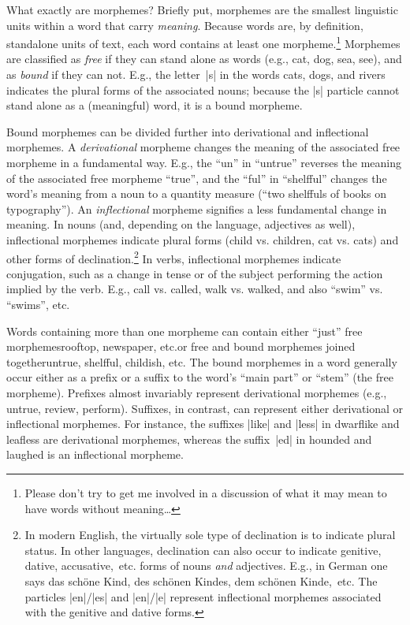 \documentclass[11pt]{article}
\begin{document}
What exactly are morphemes? Briefly put, morphemes are the smallest linguistic units within a word that carry \emph{meaning}. Because words are, by definition, standalone units of text, each word contains at least one morpheme.\footnote{Please don't try to get me involved in a discussion of what it may mean to have words without meaning\dots} Morphemes are classified as \emph{free} if they can stand alone as words (e.g., cat, dog, sea, see), and as \emph{bound} if they can not. E.g., the letter~|s| in the words cats, dogs, and rivers indicates the plural forms of the associated nouns; because the |s| particle cannot stand alone as a (meaningful) word, it is a bound morpheme. 

Bound morphemes can be divided further into derivational and inflectional morphemes. A \emph{derivational} morpheme changes the meaning of the associated free morpheme in a fundamental way. E.g., the \enquote{un} in \enquote{untrue} reverses the meaning of the associated free morpheme \enquote{true}, and the \enquote{ful} in \enquote{shelfful} changes the word's meaning from a noun to a quantity measure (\enquote{two shelffuls of books on typography}). 
An \emph{inflectional} morpheme signifies a less fundamental change in meaning. In nouns (and, depending on the language, adjectives as well), inflectional morphemes indicate plural forms (child vs. children, cat vs. cats) and other forms of declination.\footnote{In modern English, the virtually sole type of declination is to indicate plural status. In other languages, declination can also occur to indicate genitive, dative, accusative,~etc. forms of nouns \emph{and} adjectives. E.g., in German one says das schöne Kind, des schönen Kindes, dem schönen Kinde,~etc. The particles |en|/|es| and |en|/|e| represent inflectional morphemes associated with the genitive and dative forms.} In verbs, inflectional morphemes indicate conjugation, such as a change in tense or of the subject performing the action implied by the verb. E.g., call vs. called, walk vs. walked, and also \enquote{swim} vs. \enquote{swims}, etc. 

Words containing more than one morpheme can contain either \enquote{just} free morphemes\textemdash rooftop, newspaper, etc.\textemdash or free and bound morphemes joined together\textemdash untrue, shelfful, childish, etc. The bound morphemes in a word generally occur either as a prefix or a suffix to the word's \enquote{main part} or \enquote{stem} (the free morpheme). Prefixes almost invariably represent derivational morphemes (e.g., untrue, review, perform). Suffixes, in contrast, can represent either derivational or inflectional morphemes. For instance, the suffixes |like| and |less| in dwarflike and leafless are derivational morphemes, whereas the suffix~|ed| in hounded and laughed is an inflectional morpheme. 
\end{document}
